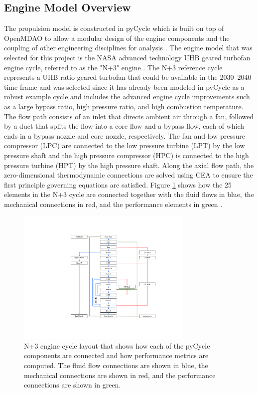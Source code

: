 \documentclass[conf]{new-aiaa}
\begin{document}
\subsection{Engine Model Overview}
The propulsion model is constructed in pyCycle which is built on top of OpenMDAO to allow a modular design of the engine components and the coupling of other engineering disciplines for analysis \cite{Gray2019a}.
The engine model that was selected for this project is the NASA advanced technology UHB geared turbofan engine cycle, referred to as the "N+3" engine \cite{Jones2017a}.
The N+3 reference cycle represents a UHB ratio geared turbofan that could be available in the 2030–2040 time frame and was selected since it has already been modeled in pyCycle as a robust example cycle and includes the advanced engine cycle improvements such as a large bypass ratio, high pressure ratio, and high combustion temperature.
The flow path consists of an inlet that directs ambient air through a fan, followed by a duct that splits the flow into a core flow and a bypass flow, each of which ends in a bypass nozzle and core nozzle, respectively.
The fan and low pressure compressor (LPC) are connected to the low pressure turbine (LPT) by the low pressure shaft and the high pressure compressor (HPC) is connected to the high pressure turbine (HPT) by the high pressure shaft.
Along the axial flow path, the zero-dimensional thermodynamic connections are solved using CEA to ensure the first principle governing equations are satisfied.
Figure \ref{fig:N3_original} shows how the 25 elements in the N+3 cycle are connected together with the fluid flows in blue, the mechanical connections in red, and the performance elements in green \cite{Hendricks2019}.

\begin{figure}[!hbt]
    \centering
    \includegraphics[width=0.75\textwidth]{N3_diagram.pdf}
    \caption{
        N+3 engine cycle layout that shows how each of the pyCycle components are connected and how performance metrics are computed.
        The fluid flow connections are shown in blue, the mechanical connections are shown in red, and the performance connections are shown in green.
    }
    \label{fig:N3_original}
\end{figure}
\end{document}
